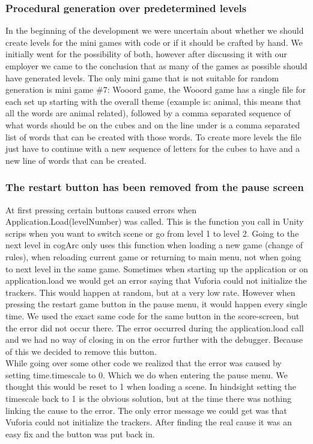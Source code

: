 \subsubsection{Procedural generation over predetermined levels}
In the beginning of the development we were uncertain about whether we should create levels for the mini games with code or if it should be crafted by hand. We initially went for the possibility of both, however after discussing it with our employer we came to the conclusion that as many of the games as possible should have generated levels. The only mini game that is not suitable for random generation is mini game \#7: Wooord game, the Wooord game has a single file for each set up starting with the overall theme (example is: animal, this means that all the words are animal related), followed by a comma separated sequence of what words should be on the cubes and on the line under is a comma separated list of words that can be created with those words. To create more levels the file just have to continue with a new sequence of letters for the cubes to have and a new line of words that can be created.

\subsubsection{The restart button has been removed from the pause screen}
At first pressing certain buttons caused errors when Application.Load(levelNumber) was called. This is the function you call in Unity scrips when you want to switch scene or go from level 1 to level 2. Going to the next level in cogArc only uses this function when loading a new game (change of rules), when reloading current game or returning to main menu, not when going to next level in the same game. Sometimes when starting up the application or on application.load we would get an error saying that Vuforia could not initialize the trackers. This would happen at random, but at a very low rate. However when pressing the restart game button in the pause menu, it would happen every single time. We used the exact same code for the same button in the score-screen, but the error did not occur there. The error occurred during the application.load call and we had no way of closing in on the error further with the debugger. Because of this we decided to remove this button.\\
While going over some other code we realized that the error was caused by setting time.timescale to 0. Which we do when entering the pause menu. We thought this would be reset to 1 when loading a scene. In hindsight setting the timescale back to 1 is the obvious solution, but at the time there was nothing linking the cause to the error. The only error message we could get was that Vuforia could not initialize the trackers. After finding the real cause it was an easy fix and the button was put back in.  
